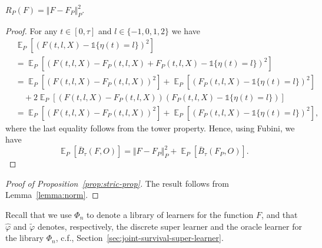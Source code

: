 \documentclass[alpha-refs]{wiley-article}
\DeclareMathOperator{\E}{\mathbb{E}} %
\renewcommand{\phi}{\varphi}
\newcommand{\1}{\mathbb{1}}
\begin{document}
\begin{lemma}
  \label{lemma:norm}
  \( R_{P}(F) = \Vert F - F_P \Vert_{P}^2 \).
\end{lemma}
\begin{proof}
  For any \( t \in [0, \tau] \) and \( l\in \{-1,0,1,2\} \) we have
  \begin{align*}
    & \E_{P}{\left[ (F(t, l, X) - \1{\{\eta(t) = l \}})^2 \right]}
    \\
    & =    \E_{P}{\left[ (F(t, l, X) - F_P(t, l, X) + F_P(t, l, X) - \1{\{\eta(t) = l
      \}})^2 \right]}
    \\
    & =    \E_{P}{\left[ (F(t, l, X) - F_P(t, l, X))^2\right]}
      + \E_{P}{\left[ (F_P(t, l, X) - \1{\{\eta(t) = l \}})^2\right]}
    \\
    & \quad
      + 2\E_{P}{\left[ (F(t, l, X) - F_P(t, l, X))(F_P(t, l, X) - \1{\{\eta(t) = l
      \}})\right]}
    \\
    & =    \E_{P}{\left[ (F(t, l, X) - F_P(t, l, X))^2\right]}
      + \E_{P}{\left[ (F_P(t, l, X) - \1{\{\eta(t) = l \}})^2\right]},
  \end{align*}
  where the last equality follows from the tower property. Hence, using Fubini,
  we have
  \begin{equation*}
    \E_P{[\bar{B}_{\tau}(F, O)]}
    = \Vert F - F_P \Vert_{P}^2 + \E_P{[\bar{B}_{\tau}(F_P, O)]}.
  \end{equation*}
\end{proof}

\begin{proof}[Proof of Proposition~\ref{prop:stric-prop}]
  The result follows from Lemma~\ref{lemma:norm}.
\end{proof}

Recall that we use \( \Phi_n \) to denote a library of learners for the
function \( F \), and that \( \hat{\phi} \) and \( \tilde{\phi} \) denotes,
respectively, the discrete super learner and the oracle learner for the library
\( \Phi_n \), c.f., Section~\ref{sec:joint-survival-super-learner}.
\end{document}
